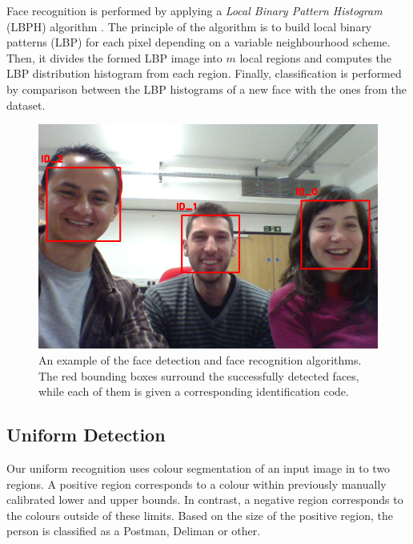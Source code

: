Face recognition is performed by applying a \textit{Local Binary Pattern Histogram} (LBPH) algorithm \cite{Ahonen04_FaceRecLBP}. The principle of the algorithm is to build local binary patterns (LBP) for each pixel depending on a variable neighbourhood scheme. Then, it divides the formed LBP image into $m$ local regions and computes the LBP distribution histogram from each region. Finally, classification is performed by comparison between the LBP histograms of a new face with the ones from the dataset.

\begin{figure}[!t]
\centering
\includegraphics[width=3.in]{BARC_FaceRec.png}
\caption{An example of the face detection and face recognition algorithms. The red bounding boxes surround the successfully detected faces, while each of them is given a corresponding identification code.}
\label{fig:face}
\end{figure}

\subsection{Uniform Detection}

Our uniform recognition uses colour segmentation of an input image in to two regions. 
A positive region corresponds to a colour within previously manually calibrated lower and upper bounds. 
In contrast, a negative region corresponds to the colours outside of these limits. 
Based on the size of the positive region, the person is classified as a Postman, Deliman or other. 









